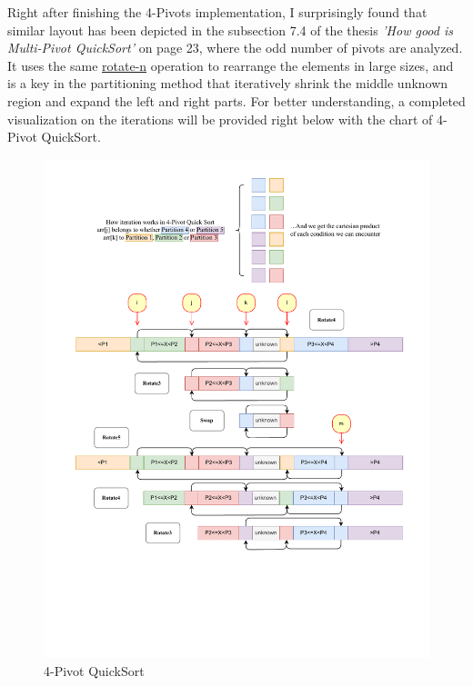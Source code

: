 \documentclass[a4paper,oneside,12pt]{book}
\begin{document}
Right after finishing the 4-Pivots implementation, I surprisingly found that similar layout has been depicted in the subsection 7.4
of the thesis \textit{'How good is Multi-Pivot QuickSort'} \cite{HowGoodIsMultiPivotQuickSort} on page 23, where the odd number of pivots are analyzed.
It uses the same \hyperlink{rotate-n}{rotate-n} operation to rearrange the elements in large sizes, and is a key in the partitioning method that
iteratively shrink the middle unknown region and expand the left and right parts. 
For better understanding, a completed visualization on the iterations will be provided right below with the chart of 4-Pivot QuickSort.

\begin{figure}[H]
    \hypertarget{fig:4pivot}{}
    \caption{4-Pivot QuickSort}
    \centering
    \hspace*{-0.25\textwidth}
    \includegraphics[width=1.5\textwidth]{4pivot.drawio.pdf}
\end{figure}
\end{document}
